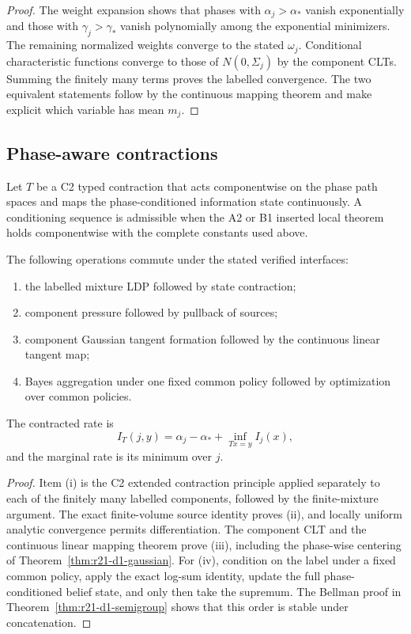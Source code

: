\begin{proof}
The weight expansion shows that phases with $\alpha_j>\alpha_*$ vanish
exponentially and those with $\gamma_j>\gamma_*$ vanish polynomially among the
exponential minimizers.  The remaining normalized weights converge to the
stated $\omega_j$.  Conditional characteristic functions converge to those
of $N(0,\Sigma_j)$ by the component CLTs.  Summing the finitely many terms
proves the labelled convergence.  The two equivalent statements follow by
the continuous mapping theorem and make explicit which variable has mean
$m_j$.
\end{proof}

\subsection{Phase-aware contractions}

Let $T$ be a C2 typed contraction that acts componentwise on the phase path
spaces and maps the phase-conditioned information state continuously.  A
conditioning sequence is admissible when the A2 or B1 inserted local theorem
holds componentwise with the complete constants used above.

\begin{theorem}
\label{thm:r21-d1-contraction}
The following operations commute under the stated verified interfaces:
\begin{enumerate}[label=(\roman*)]
\item the labelled mixture LDP followed by state contraction;
\item component pressure followed by pullback of sources;
\item component Gaussian tangent formation followed by the continuous linear
      tangent map;
\item Bayes aggregation under one fixed common policy followed by optimization
      over common policies.
\end{enumerate}
The contracted rate is
\[
 I_T(j,y)=\alpha_j-\alpha_*+\inf_{Tx=y}I_j(x),
\]
and the marginal rate is its minimum over $j$.
\end{theorem}

\begin{proof}
Item (i) is the C2 extended contraction principle applied separately to each
of the finitely many labelled components, followed by the finite-mixture
argument.  The exact finite-volume source identity proves (ii), and locally
uniform analytic convergence permits differentiation.  The component CLT and
the continuous linear mapping theorem prove (iii), including the phase-wise
centering of Theorem~\ref{thm:r21-d1-gaussian}.  For (iv), condition on the
label under a fixed common policy, apply the exact log-sum identity, update the
full phase-conditioned belief state, and only then take the supremum.  The
Bellman proof in Theorem~\ref{thm:r21-d1-semigroup} shows that this order is
stable under concatenation.
\end{proof}

